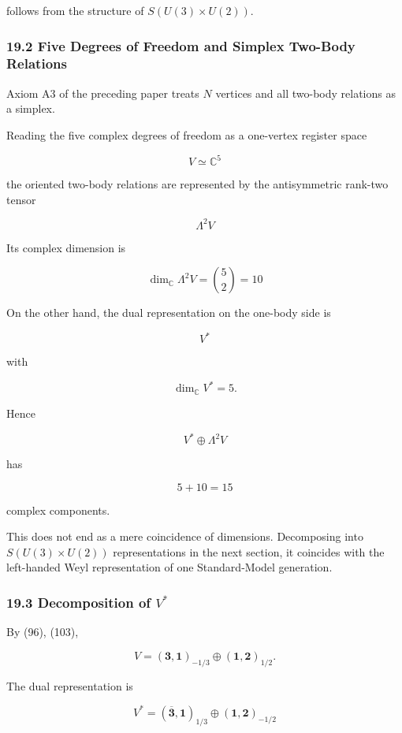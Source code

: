 \documentclass[
  a4paper,
]{article}
\begin{document}
follows from the structure of \(S(U(3)\times U(2))\).

\subsubsection{19.2 Five Degrees of Freedom and Simplex Two-Body
Relations}\label{five-degrees-of-freedom-and-simplex-two-body-relations}

Axiom A3 of the preceding paper treats \(N\) vertices and all two-body
relations as a simplex.

Reading the five complex degrees of freedom as a one-vertex register
space

\[
V\simeq\mathbb C^5
\]

the oriented two-body relations are represented by the antisymmetric
rank-two tensor

\[
\boxed{
\Lambda^2V
}
\tag{106}
\]

Its complex dimension is

\[
\boxed{
\dim_{\mathbb C}\Lambda^2V
=
\binom52
=
10
}
\tag{107}
\]

On the other hand, the dual representation on the one-body side is

\[
V^*
\]

with

\[
\dim_{\mathbb C}V^*=5.
\]

Hence

\[
\boxed{
V^*\oplus\Lambda^2V
}
\tag{108}
\]

has

\[
\boxed{
5+10=15
}
\tag{109}
\]

complex components.

This does not end as a mere coincidence of dimensions. Decomposing into
\(S(U(3)\times U(2))\) representations in the next section, it coincides
with the left-handed Weyl representation of one Standard-Model
generation.

\subsubsection{\texorpdfstring{19.3 Decomposition of
\(V^*\)}{19.3 Decomposition of V\^{}*}}\label{decomposition-of-v}

By (96), (103),

\[
V
=
(\mathbf3,\mathbf1)_{-1/3}
\oplus
(\mathbf1,\mathbf2)_{1/2}.
\tag{110}
\]

The dual representation is

\[
\boxed{
V^*
=
(\overline{\mathbf3},\mathbf1)_{1/3}
\oplus
(\mathbf1,\mathbf2)_{-1/2}
}
\tag{111}
\]
\end{document}
